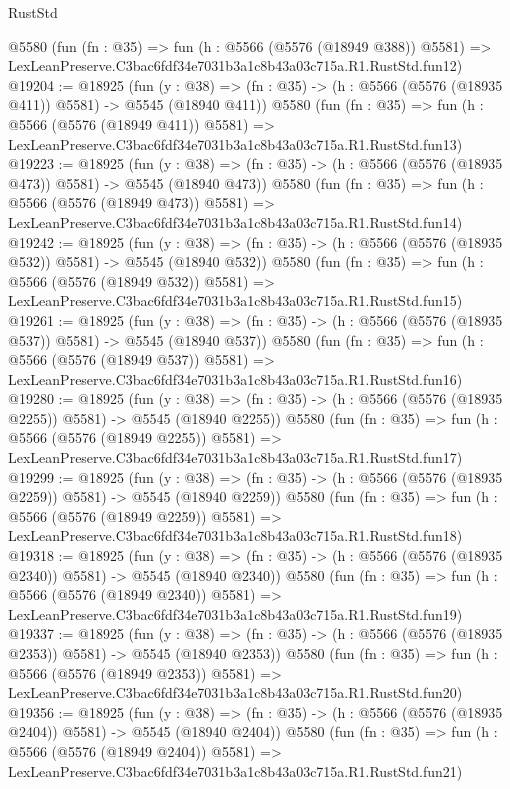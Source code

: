 \begin{lexlean}{RustStd}
\begin{coremodule}
    @5580
    (fun (fn : @35) =>
    fun (h : @5566 (@5576 (@18949 @388)) @5581) =>
    LexLeanPreserve.C3bac6fdf34e7031b3a1c8b43a03c715a.R1.RustStd.fun12)
@19204 := @18925
    (fun (y : @38) => (fn : @35) -> (h : @5566 (@5576 (@18935 @411)) @5581) -> @5545 (@18940 @411))
    @5580
    (fun (fn : @35) =>
    fun (h : @5566 (@5576 (@18949 @411)) @5581) =>
    LexLeanPreserve.C3bac6fdf34e7031b3a1c8b43a03c715a.R1.RustStd.fun13)
@19223 := @18925
    (fun (y : @38) => (fn : @35) -> (h : @5566 (@5576 (@18935 @473)) @5581) -> @5545 (@18940 @473))
    @5580
    (fun (fn : @35) =>
    fun (h : @5566 (@5576 (@18949 @473)) @5581) =>
    LexLeanPreserve.C3bac6fdf34e7031b3a1c8b43a03c715a.R1.RustStd.fun14)
@19242 := @18925
    (fun (y : @38) => (fn : @35) -> (h : @5566 (@5576 (@18935 @532)) @5581) -> @5545 (@18940 @532))
    @5580
    (fun (fn : @35) =>
    fun (h : @5566 (@5576 (@18949 @532)) @5581) =>
    LexLeanPreserve.C3bac6fdf34e7031b3a1c8b43a03c715a.R1.RustStd.fun15)
@19261 := @18925
    (fun (y : @38) => (fn : @35) -> (h : @5566 (@5576 (@18935 @537)) @5581) -> @5545 (@18940 @537))
    @5580
    (fun (fn : @35) =>
    fun (h : @5566 (@5576 (@18949 @537)) @5581) =>
    LexLeanPreserve.C3bac6fdf34e7031b3a1c8b43a03c715a.R1.RustStd.fun16)
@19280 := @18925
    (fun (y : @38) =>
    (fn : @35) -> (h : @5566 (@5576 (@18935 @2255)) @5581) -> @5545 (@18940 @2255))
    @5580
    (fun (fn : @35) =>
    fun (h : @5566 (@5576 (@18949 @2255)) @5581) =>
    LexLeanPreserve.C3bac6fdf34e7031b3a1c8b43a03c715a.R1.RustStd.fun17)
@19299 := @18925
    (fun (y : @38) =>
    (fn : @35) -> (h : @5566 (@5576 (@18935 @2259)) @5581) -> @5545 (@18940 @2259))
    @5580
    (fun (fn : @35) =>
    fun (h : @5566 (@5576 (@18949 @2259)) @5581) =>
    LexLeanPreserve.C3bac6fdf34e7031b3a1c8b43a03c715a.R1.RustStd.fun18)
@19318 := @18925
    (fun (y : @38) =>
    (fn : @35) -> (h : @5566 (@5576 (@18935 @2340)) @5581) -> @5545 (@18940 @2340))
    @5580
    (fun (fn : @35) =>
    fun (h : @5566 (@5576 (@18949 @2340)) @5581) =>
    LexLeanPreserve.C3bac6fdf34e7031b3a1c8b43a03c715a.R1.RustStd.fun19)
@19337 := @18925
    (fun (y : @38) =>
    (fn : @35) -> (h : @5566 (@5576 (@18935 @2353)) @5581) -> @5545 (@18940 @2353))
    @5580
    (fun (fn : @35) =>
    fun (h : @5566 (@5576 (@18949 @2353)) @5581) =>
    LexLeanPreserve.C3bac6fdf34e7031b3a1c8b43a03c715a.R1.RustStd.fun20)
@19356 := @18925
    (fun (y : @38) =>
    (fn : @35) -> (h : @5566 (@5576 (@18935 @2404)) @5581) -> @5545 (@18940 @2404))
    @5580
    (fun (fn : @35) =>
    fun (h : @5566 (@5576 (@18949 @2404)) @5581) =>
    LexLeanPreserve.C3bac6fdf34e7031b3a1c8b43a03c715a.R1.RustStd.fun21)

\end{coremodule}
\end{lexlean}
